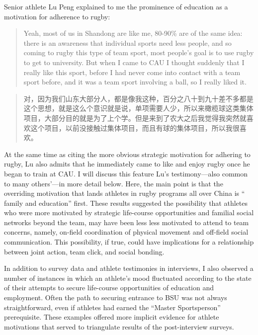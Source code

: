 \begin{CJK}{UTF8}{gbsn}
Senior athlete Lu Peng explained to me the prominence of education as a motivation for adherence to rugby:
      \begin{quote}
          Yeah, most of us in Shandong are like me, 80-90\% are of the same idea: there is an awareness that individual sports need less people, and so coming to rugby this type of team sport, most people's goal is to use rugby to get to university.  But when I came to CAU I thought suddenly that I really like this sport, before I had never come into contact with a team sport before, and it was a team sport involving a ball, so I really liked it.
      \end{quote}
      \begin{quote}
           对，因为我们山东大部分人，都是像我这种，百分之八十到九十差不多都是这个思想，就是这么个意识就是说，单项需要人少，所以来橄榄球这类集体项目，大部分目的就是为了上个学。但是来到了农大之后我觉得我突然就喜欢这个项目，以前没接触过集体项目，而且有球的集体项目，所以我很喜欢。
      \end{quote}
At the same time as citing the more obvious strategic motivation for adhering to rugby, Lu also admits that he immediately came to like and enjoy rugby once he began to train at CAU. I will discuss this feature Lu's testimony—also common to many others'---in more detail below.  Here, the main point is that the overriding motivation that lands athletes in rugby programs all over China is `` family and education'' first.
These results suggested the possibility that athletes who were more motivated by strategic life-course opportunities and familial social networks beyond the team, may have been less less motivated to attend to team concerns, namely, on-field coordination of physical movement and off-field social communication.  This possibility, if true, could have implications for a relationship between joint action, team click, and social bonding.

In addition to survey data and athlete testimonies in interviews, I also observed a number of instances in which an athlete's mood fluctuated according to the state of their attempts to secure life-course opportunities of education and employment.  Often the path to securing entrance to BSU was not always straightforward, even if athletes had earned the ``Master Sportsperson'' prerequisite. These examples offered more implicit evidence for athlete motivations that served to triangulate results of the post-interview surveys.


\end{CJK}
